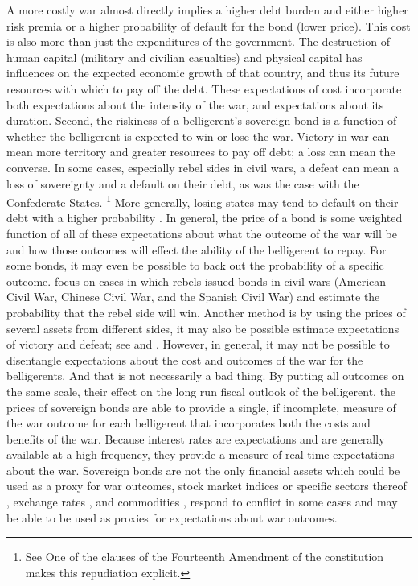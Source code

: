 A more costly war almost directly implies a higher debt burden and either higher risk premia or a higher probability of default for the bond (lower price).
This cost is also more than just the expenditures of the government. 
The destruction of human capital (military and civilian casualties) and physical capital has influences on the expected economic growth of that country, and thus its future resources with which to pay off the debt.
These expectations of cost incorporate both expectations about the intensity of the war, and expectations about its duration.
Second, the riskiness of a belligerent's sovereign bond is a function of whether the belligerent is expected to win or lose the war.
Victory in war can mean more territory and greater resources to pay off debt; a loss can mean the converse.
In some cases, especially rebel sides in civil wars, a defeat can mean a loss of sovereignty and a default on their debt, as was the case with the Confederate States.%
\footnote{See One of the clauses of the Fourteenth Amendment of the constitution makes this repudiation explicit.}
More generally, losing states may tend to default on their debt with a higher probability \parencite{Slantchev2012a}.
In general, the price of a bond is some weighted function of all of these expectations about what the outcome of the war will be and how those outcomes will effect the ability of the belligerent to repay.
For some bonds, it may even be possible to back out the probability of a specific outcome.
\textcite{HaberMitchenerOosterlinckEtAl2015} focus on cases in which rebels issued bonds in civil wars (American Civil War, Chinese Civil War, and the Spanish Civil War) and estimate the probability that the rebel side will win.
Another method is by using the prices of several assets from different sides, it may also be possible estimate expectations of victory and defeat; see \textcite{Hall2004} and \textcite{McCandless1996}.
However, in general, it may not be possible to disentangle expectations about the cost and outcomes of the war for the belligerents. 
And that is not necessarily a bad thing.
By putting all outcomes on the same scale, their effect on the long run fiscal outlook of the belligerent, the prices of sovereign bonds are able to provide a single, if incomplete, measure of the war outcome for each belligerent that incorporates both the costs and benefits of the war.
Because interest rates are expectations and are generally available at a high frequency, they provide a measure of real-time expectations about the war.
Sovereign bonds are not the only financial assets which could be used as a proxy for war outcomes, stock market indices or specific sectors thereof \textcites{ChenSiems2004}{SchneiderTroeger2006}{WolfersZitzewitz2009}, exchange rates \textcites{Hall2004}, and commodities \textcites{WolfersZitzewitz2009}, respond to conflict in some cases and may be able to be used as proxies for expectations about war outcomes.
